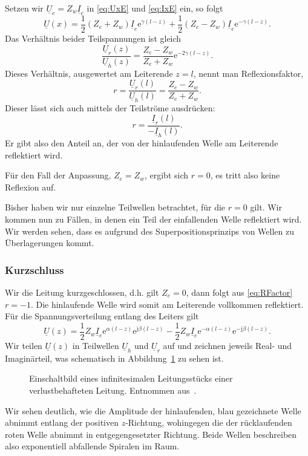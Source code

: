 \documentclass[paper=a4, parskip=half-, ngerman, fontsize=11pt]{scrreprt}
\begin{document}
Setzen wir $\underline{U}_{e} = Z_{w} \underline{I}_{e}$ in \eqref{eq:UxE} und \eqref{eq:IxE} ein, so folgt
\[
\underline{U}(x) = \frac{1}{2} (Z_{e} + Z_{w}) \underline{I}_{e} \mathrm{e}^{\gamma (l - z)}
+
\frac{1}{2} (Z_{e} - Z_{w}) \underline{I}_{e} \mathrm{e}^{- \gamma (l - z)} .
\]
Das Verhältnis beider Teilspannungen ist gleich
\[
\frac{\underline{U}_{r}(z)}{\underline{U}_{h}(z)} = \frac{Z_{e}-Z_{w}}{Z_{e}+Z_{w}} \mathrm{e}^{-2 \gamma (l-z)}.
\]
Dieses Verhältnis, ausgewertet am Leiterende $z = l$, nennt man Reflexionsfaktor,
\begin{equation}
r = \frac{\underline{U}_{r}(l)}{\underline{U}_{h}(l)} = \frac{Z_{e}-Z_{w}}{Z_{e}+Z_{w}} \label{eq:RFactor}.
\end{equation}
Dieser lässt sich auch mittels der Teilströme ausdrücken:
\begin{equation}
    r = \frac{\underline{I}_{r}(l)}{- \underline{I}_{h}(l)}.
\end{equation}
Er gibt also den Anteil an, der von der hinlaufenden Welle am Leiterende reflektiert wird.

Für den Fall der Anpassung, $Z_{e} = Z_{w}$, ergibt sich $r = 0$, es tritt also keine Reflexion auf.

Bisher haben wir nur einzelne Teilwellen betrachtet, für die $r = 0$ gilt. Wir kommen nun zu Fällen, in denen ein Teil
der einfallenden Welle reflektiert wird. Wir werden sehen, dass es aufgrund des Superpositionsprinzips von Wellen zu
Überlagerungen kommt.


\subsubsection{Kurzschluss}
Wir die Leitung kurzgeschlossen, d.h. gilt $Z_{e} = 0$, dann folgt aus \eqref{eq:RFactor} $r=-1$. Die hinlaufende Welle
wird somit am Leiterende vollkommen reflektiert. Für die Spannungsverteilung entlang des Leiters gilt
\begin{equation}
\underline{U}(z) =
\frac{1}{2} Z_{w} \underline{I}_{e}
\mathrm{e}^{\alpha (l - z)}
\mathrm{e}^{\mathrm{j} \beta (l - z)}
-
\frac{1}{2} Z_{w} \underline{I}_{e}
\mathrm{e}^{- \alpha (l - z)}
\mathrm{e}^{- \mathrm{j} \beta (l - z)} \label{eq:UKurzschluss}.
\end{equation}
Wir teilen $\underline{U}(z)$ in Teilwellen $\underline{U}_{h}$ und $\underline{U}_{r}$ auf und zeichnen jeweils Real-
und Imaginärteil, was schematisch in
Abbildung~\ref{ImaginaerWelle} zu sehen ist.
\begin{figure}[!htpb]
    \begin{center}
        
        \caption{Einschaltbild eines infinitesimalen Leitungsstücks einer verlustbehafteten Leitung. Entnommen
            aus~\cite{LeitungenUndFilter}.}
        \label{ImaginaerWelle}
    \end{center}
\end{figure}
Wir sehen deutlich, wie die Amplitude der hinlaufenden, blau gezeichnete Welle abnimmt entlang der positiven
$z$-Richtung, wohingegen die der rücklaufenden roten Welle abnimmt in entgegengesetzter Richtung. Beide Wellen
beschreiben also exponentiell abfallende Spiralen im Raum.
\end{document}
